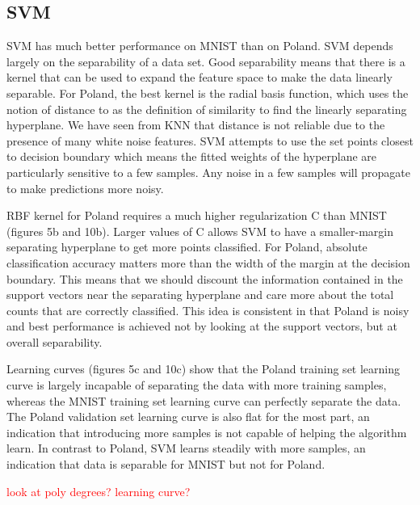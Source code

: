 \documentclass{article}
\newcommand\todo[1]{\textcolor{red}{#1}}
\begin{document}
\subsection*{SVM}
SVM has much better performance on MNIST than on Poland. SVM depends largely on the separability of a data set. Good separability means that there is a kernel that can be used to expand the feature space to make the data linearly separable. For Poland, the best kernel is the radial basis function, which uses the notion of distance to as the definition of similarity to find the linearly separating hyperplane. We have seen from KNN that distance is not reliable due to the presence of many white noise features. SVM attempts to use the set points closest to decision boundary which means the fitted weights of the hyperplane are particularly sensitive to a few samples. Any noise in a few samples will propagate to make predictions more noisy. 

RBF kernel for Poland requires a much higher regularization C than MNIST (figures 5b and 10b). Larger values of C allows SVM to have a smaller-margin separating hyperplane to get more points classified. For Poland, absolute classification accuracy matters more than the width of the margin at the decision boundary. This means that we should discount the information contained in the support vectors near the separating hyperplane and care more about the total counts that are correctly classified. This idea is consistent in that Poland is noisy and best performance is achieved not by looking at the support vectors, but at overall separability. 

Learning curves (figures 5c and 10c) show that the Poland training set learning curve is largely incapable of separating the data with more training samples, whereas the MNIST training set learning curve can perfectly separate the data. The Poland validation set learning curve is also flat for the most part, an indication that introducing more samples is not capable of helping the algorithm learn. In contrast to Poland, SVM learns steadily with more samples, an indication that data is separable for MNIST but not for Poland. 

\todo{look at poly degrees?}
\todo{learning curve?}
\end{document}

